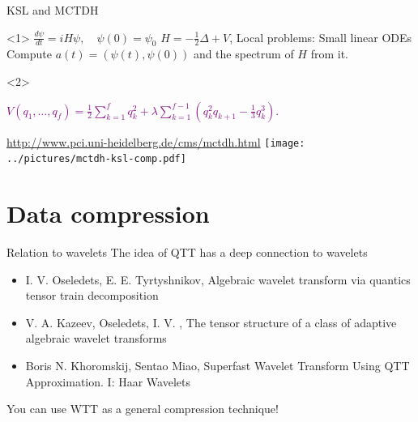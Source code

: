 \documentclass{beamer}[14pt, presentation]
\begin{document}
\begin{frame}[label=sec-7-8]{KSL and MCTDH}
\begin{onlyenv}<1>
$\frac{d \psi}{dt} = i H \psi, \quad \psi(0) = \psi_0$ \vskip 2mm
$H = -\frac{1}{2} \Delta + V$, \vskip 2mm
Local problems: 
\vskip 2mm 
Small linear ODEs
\vskip 2mm
Compute $a(t) = (\psi(t), \psi(0))$ and the spectrum of $H$ from it. 
\end{onlyenv}

\begin{onlyenv}<2>
\begin{small}
            \textcolor{purple}{$ V(q_1,\ldots,q_f) = \frac{1}{2}\sum_{k=1}^f q^2_k + \lambda \sum_{k=1}^{f-1}\left(q^2_k q_{k+1} - \frac{1}{3}q^3_k \right).$}
\end{small}
\url{http://www.pci.uni-heidelberg.de/cms/mctdh.html}  
\texttt{[image: ../pictures/mctdh-ksl-comp.pdf]}
\end{onlyenv}
\end{frame}
\section{Data compression}
\label{sec-8}
\begin{frame}[label=sec-8-1]{Relation to wavelets}
The idea of QTT has a deep connection to \alert{wavelets}
\begin{itemize}
\item I. V. Oseledets, E. E. Tyrtyshnikov, Algebraic wavelet transform via
quantics tensor train decomposition
\item V. A. Kazeev,  Oseledets, I. V. , The tensor structure of a class of
adaptive algebraic wavelet transforms
\item Boris N. Khoromskij,  Sentao Miao, Superfast Wavelet Transform Using QTT Approximation. I: Haar Wavelets
\end{itemize}



You can use \alert{WTT} as a general compression technique!
\end{frame}
\end{document}
